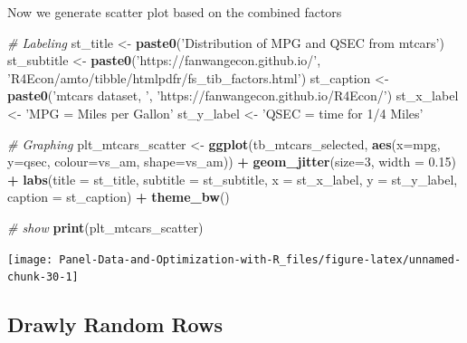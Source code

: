 \documentclass[
]{book}
\newenvironment{Shaded}{\begin{snugshade}}{\end{snugshade}}
\newcommand{\CommentTok}[1]{\textcolor[rgb]{0.56,0.35,0.01}{\textit{#1}}}
\newcommand{\DataTypeTok}[1]{\textcolor[rgb]{0.13,0.29,0.53}{#1}}
\newcommand{\DecValTok}[1]{\textcolor[rgb]{0.00,0.00,0.81}{#1}}
\newcommand{\FloatTok}[1]{\textcolor[rgb]{0.00,0.00,0.81}{#1}}
\newcommand{\KeywordTok}[1]{\textcolor[rgb]{0.13,0.29,0.53}{\textbf{#1}}}
\newcommand{\NormalTok}[1]{#1}
\newcommand{\OperatorTok}[1]{\textcolor[rgb]{0.81,0.36,0.00}{\textbf{#1}}}
\newcommand{\StringTok}[1]{\textcolor[rgb]{0.31,0.60,0.02}{#1}}
\begin{document}
Now we generate scatter plot based on the combined factors

\begin{Shaded}
\begin{Highlighting}[]
\CommentTok{# Labeling}
\NormalTok{st_title <-}\StringTok{ }\KeywordTok{paste0}\NormalTok{(}\StringTok{'Distribution of MPG and QSEC from mtcars'}\NormalTok{)}
\NormalTok{st_subtitle <-}\StringTok{ }\KeywordTok{paste0}\NormalTok{(}\StringTok{'https://fanwangecon.github.io/'}\NormalTok{,}
                      \StringTok{'R4Econ/amto/tibble/htmlpdfr/fs_tib_factors.html'}\NormalTok{)}
\NormalTok{st_caption <-}\StringTok{ }\KeywordTok{paste0}\NormalTok{(}\StringTok{'mtcars dataset, '}\NormalTok{,}
                     \StringTok{'https://fanwangecon.github.io/R4Econ/'}\NormalTok{)}
\NormalTok{st_x_label <-}\StringTok{ 'MPG = Miles per Gallon'}
\NormalTok{st_y_label <-}\StringTok{ 'QSEC = time for 1/4 Miles'}

\CommentTok{# Graphing}
\NormalTok{plt_mtcars_scatter <-}\StringTok{ }
\StringTok{  }\KeywordTok{ggplot}\NormalTok{(tb_mtcars_selected, }
         \KeywordTok{aes}\NormalTok{(}\DataTypeTok{x=}\NormalTok{mpg, }\DataTypeTok{y=}\NormalTok{qsec, }\DataTypeTok{colour=}\NormalTok{vs_am, }\DataTypeTok{shape=}\NormalTok{vs_am)) }\OperatorTok{+}
\StringTok{  }\KeywordTok{geom_jitter}\NormalTok{(}\DataTypeTok{size=}\DecValTok{3}\NormalTok{, }\DataTypeTok{width =} \FloatTok{0.15}\NormalTok{) }\OperatorTok{+}
\StringTok{  }\KeywordTok{labs}\NormalTok{(}\DataTypeTok{title =}\NormalTok{ st_title, }\DataTypeTok{subtitle =}\NormalTok{ st_subtitle,}
       \DataTypeTok{x =}\NormalTok{ st_x_label, }\DataTypeTok{y =}\NormalTok{ st_y_label, }\DataTypeTok{caption =}\NormalTok{ st_caption) }\OperatorTok{+}
\StringTok{  }\KeywordTok{theme_bw}\NormalTok{()}

\CommentTok{# show}
\KeywordTok{print}\NormalTok{(plt_mtcars_scatter)}
\end{Highlighting}
\end{Shaded}

\begin{center}\texttt{[image: Panel-Data-and-Optimization-with-R\_files/figure-latex/unnamed-chunk-30-1]} \end{center}

\hypertarget{drawly-random-rows}{%
\subsection{Drawly Random Rows}\label{drawly-random-rows}}
\end{document}
